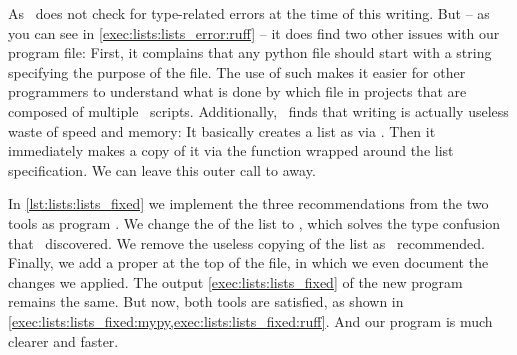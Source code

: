 As \ruff\ does not check for type-related errors at the time of this writing.
But -- as you can see in \cref{exec:lists:lists_error:ruff} -- it does find two other issues with our program file:
First, it complains that any python file should start with a string specifying the purpose of the file.
The use of such  makes it easier for other programmers to understand what is done by which file in projects that are composed of multiple \python\ scripts.%
%
%
%
Additionally, \ruff\ finds that writing  is actually useless waste of speed and memory:
It basically creates a list as  via \pythonil{[1, 2, 3]}.
Then it immediately makes a copy of it via the  function wrapped around the list specification.
We can leave this outer call to  away.

%
%
%
%
\begin{sloppypar}%
In \cref{lst:lists:lists_fixed} we implement the three recommendations from the two tools as program .
We change the  of the list to , which solves the type confusion that \mypy\ discovered.
We remove the useless copying of the list as \ruff\ recommended.
Finally, we add a proper  at the top of the file, in which we even document the changes we applied.
The output \cref{exec:lists:lists_fixed} of the new program remains the same.
But now, both tools are satisfied, as shown in \cref{exec:lists:lists_fixed:mypy,exec:lists:lists_fixed:ruff}.
And our program is much clearer and faster.%
\end{sloppypar}%
%
%
%
%
%

